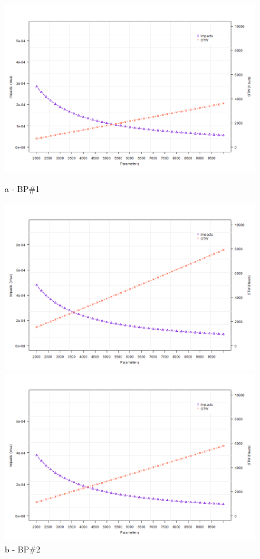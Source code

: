 \begin{figure}[!htb]
	\begin{minipage}[b]{0.5\linewidth}
		\centering
		\includegraphics[width=\textwidth]{figures/ch05_fig_etasa_pump1}
		\caption*{a - BP\#1}
	\end{minipage}
	\hspace{0.05cm}
	\begin{minipage}[b]{0.5\linewidth}
		\centering
		\includegraphics[width=\textwidth]{figures/ch05_fig_etasa_pump2}
		\caption*{b - BP\#2}
	\end{minipage}
	\hspace{0.05cm}
	\begin{minipage}[b]{0.5\linewidth}
		\centering
		\includegraphics[width=\textwidth]{figures/ch05_fig_etasa_pump3}

\end{minipage}
\end{figure}
